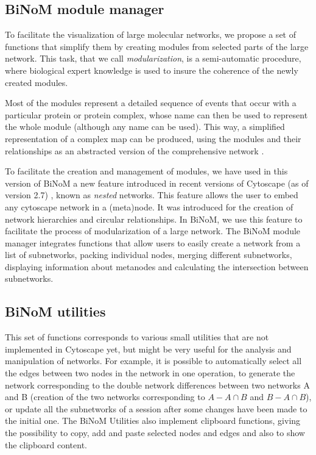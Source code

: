 \documentclass[11pt]{bmc_article_s50}
\newenvironment{bmcformat}{\begin{raggedright}\baselineskip20pt\sloppy\setboolean{publ}{false}}{\end{raggedright}\baselineskip20pt\sloppy}
\begin{document}
\begin{bmcformat}
\subsection*{BiNoM module manager}

To facilitate the visualization of large molecular networks, we propose a set of
functions that simplify them by creating modules from selected parts of the
large network. This task, that we call \emph{modularization}, is a
semi-automatic procedure, where biological expert knowledge is used to insure
the coherence of the newly created modules.

Most of the modules represent a detailed
sequence of events that occur with a particular protein or protein complex,
whose name can then be used to represent the whole module (although any name can be used). This way, a
simplified representation of a complex map can be produced, using the modules
and their relationships as an abstracted version of the comprehensive network
\cite{calzone2008comprehensive}.

To facilitate the creation and management of modules, we have used in this
version of BiNoM a new feature introduced in recent versions of Cytoscape (as of
version 2.7) \cite{cline2007integration}, known as \emph{nested} networks. This
feature allows the user to embed any cytoscape network in a (meta)node. It was
introduced for the creation of network hierarchies and circular
relationships. In BiNoM, we use this feature to facilitate the process of
modularization of a large network. The BiNoM module manager integrates
functions that allow users to easily create a network from a list of subnetworks,
packing individual nodes, merging different subnetworks, displaying information
about metanodes and calculating the intersection between subnetworks.

\subsection*{BiNoM utilities}
This set of functions corresponds to various small utilities that are not
implemented in Cytoscape yet, but might be very useful for the analysis and
manipulation of networks. For example, it is possible to automatically select
all the edges between two nodes in the network in one operation, to generate the
network corresponding to the double
network differences between two networks A and B (creation of the two networks
corresponding to $A - A \cap B$ and $B - A \cap B$), or update all the
subnetworks of
a session after some changes have been made to the initial one. The BiNoM
Utilities also implement
clipboard functions, giving the possibility to copy, add and paste
selected nodes and edges and also to show the clipboard content.



\end{bmcformat}
\end{document}

